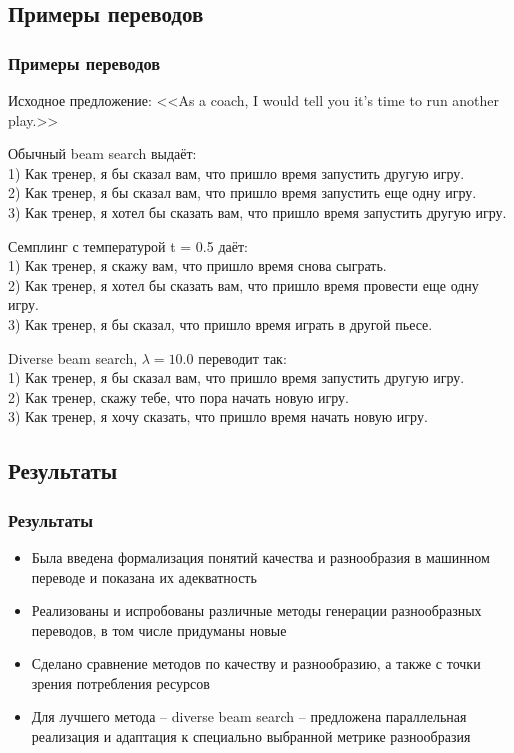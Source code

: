 \documentclass[unicode]{beamer}
\begin{document}
\subsection{Примеры переводов}
\begin{frame}
\frametitle{Примеры переводов}
{\small
Исходное предложение: <<As a coach, I would tell you it's time to run another play.>> \newline

Обычный beam search выдаёт:\\
1) Как тренер, я бы сказал вам, что пришло время запустить другую игру.\\
2) Как тренер, я бы сказал вам, что пришло время запустить еще одну игру.\\
3) Как тренер, я хотел бы сказать вам, что пришло время запустить другую игру.
\newline

Семплинг с температурой t = 0.5 даёт: \\
1) Как тренер, я скажу вам, что пришло время снова сыграть.\\
2) Как тренер, я хотел бы сказать вам, что пришло время провести еще одну игру.\\
3) Как тренер, я бы сказал, что пришло время играть в другой пьесе. \newline

Diverse beam search, $\lambda = 10.0$ переводит так: \\
1) Как тренер, я бы сказал вам, что пришло время запустить другую игру.\\
2) Как тренер, скажу тебе, что пора начать новую игру.\\
3) Как тренер, я хочу сказать, что пришло время начать новую игру.
\newline
}
\end{frame}


\subsection{Результаты}
\begin{frame}
\frametitle{Результаты}
\begin{itemize}
\item Была введена формализация понятий качества и разнообразия в машинном переводе и показана их адекватность \newline
\item Реализованы и испробованы различные методы генерации разнообразных переводов, в том числе придуманы новые \newline
\item Сделано сравнение методов по качеству и разнообразию, а также с точки зрения потребления ресурсов \newline
\item Для лучшего метода -- diverse beam search -- предложена параллельная реализация и адаптация к специально выбранной метрике разнообразия \newline
\end{itemize}
\end{frame}
\end{document}
